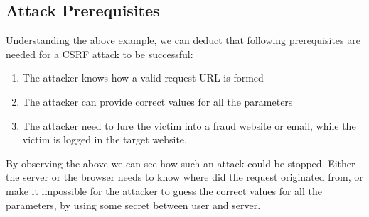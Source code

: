 \subsection{Attack Prerequisites}
Understanding the above example, we can deduct that following prerequisites are needed for a CSRF attack to be
successful:
\begin{enumerate}
	\item The attacker knows how a valid request URL is formed 
	\item The attacker can provide correct values for all the parameters
	\item The attacker need to lure the victim into a fraud website or email, while the victim is logged in the target website.
\end{enumerate}    
By observing the above we can see how such an attack could be stopped.  Either the server or the browser needs to know
where did the request originated from, or make it impossible for the attacker to guess the correct values for all the
parameters, by using some secret between user and server. 
